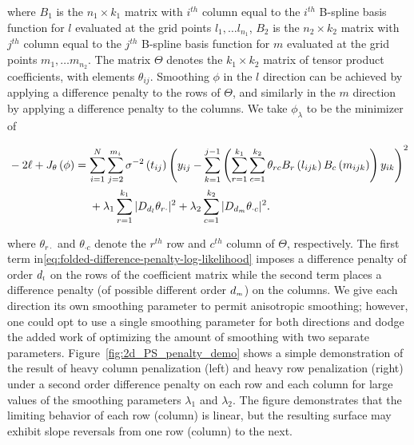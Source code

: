 \noindent 
where $B_1$ is the $n_1 \times k_1$ matrix with $i^{th}$ column equal to the $i^{th}$ B-spline basis function for $l$ evaluated at the grid points $l_1,\dots l_{n_1}$,  $B_2$ is the $n_2 \times k_2$ matrix with $j^{th}$ column equal to the $j^{th}$ B-spline basis function for $m$ evaluated at the grid points $m_1,\dots m_{n_2}$. The matrix $\Theta$ denotes the $k_1 \times k_2$ matrix of tensor product coefficients, with elements $\theta_{ij}$. Smoothing $\phi$ in the $l$ direction can be achieved by applying a difference penalty to the rows of $\Theta$, and similarly in the $m$ direction by applying a difference penalty to the columns. We take $\phi_\lambda$ to be the minimizer of 

\begin{align} 
\begin{split}\label{eq:folded-difference-penalty-log-likelihood}
&-2\ell + J_\theta \left(\phi\right) = \sum_{i=1}^N \sum_{j=2}^{m_i} \sigma^{-2}\left({t_{ij}}\right) \left(y_{ij} - \sum_{k=1}^{j-1} \left( \sum_{r=1}^{k_1} \sum_{c=1}^{k_2} \theta_{rc} B_r\left(l_{ijk}\right)B_c\left(m_{ijk}\right)\right)y_{ik} \right)^2 \\ 
&\phantom{{}-2\ell + J_\theta \left(\phi\right) = {}} + \lambda_1 \sum_{r=1}^{k_1} \vert D_{d_{\ms l}} \theta_{r \cdot} \vert^2 + \lambda_2 \sum_{c=1}^{k_2} \vert D_{d_{\ms m}} \theta_{\cdot c} \vert^2.
\end{split}
\end{align}

\noindent
where $\theta_{r \cdot}$ and $\theta_{\cdot c}$ denote the $r^{th}$ row and $c^{th}$ column of $\Theta$, respectively. The first term in\ref{eq:folded-difference-penalty-log-likelihood} imposes a difference penalty of order $d_{\scriptscriptstyle l}$ on the rows of the coefficient matrix while the second term places a difference penalty (of possible different order $d_{\scriptscriptstyle m}$) on the columns. We give each direction its own smoothing parameter to permit anisotropic smoothing; however, one could opt to use a single smoothing parameter for both directions and dodge the added work of optimizing the amount of smoothing with two separate parameters. Figure~\ref{fig:2d_PS_penalty_demo} shows a simple demonstration of the result of heavy column penalization (left) and heavy row penalization (right) under a second order difference penalty on each row and each column for large values of the smoothing parameters $\lambda_1$ and $\lambda_2$. The figure demonstrates that the limiting behavior of each row (column) is linear, but the resulting surface may exhibit slope reversals from one row (column) to the next. 

